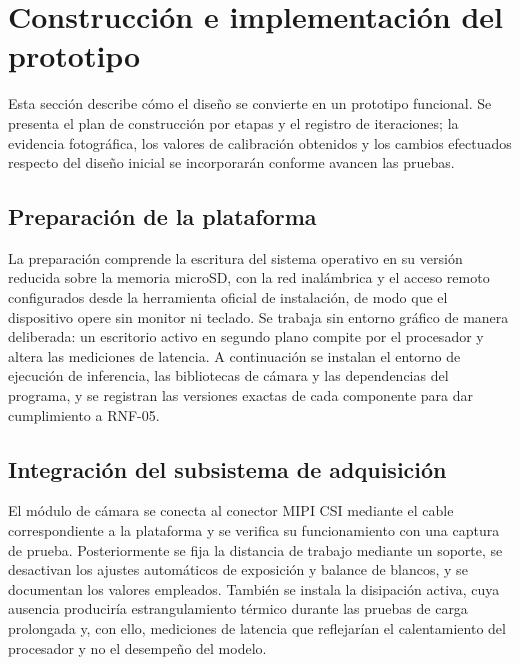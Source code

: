 \section{Construcción e implementación del prototipo}

Esta sección describe cómo el diseño se convierte en un prototipo funcional.
Se presenta el plan de construcción por etapas y el registro de iteraciones;
la evidencia fotográfica, los valores de calibración obtenidos y los cambios
efectuados respecto del diseño inicial se incorporarán conforme avancen las
pruebas.


\subsection{Preparación de la plataforma}

La preparación comprende la escritura del sistema operativo en su versión
reducida sobre la memoria microSD, con la red inalámbrica y el acceso remoto
configurados desde la herramienta oficial de instalación, de modo que el
dispositivo opere sin monitor ni teclado. Se trabaja sin entorno gráfico de
manera deliberada: un escritorio activo en segundo plano compite por el
procesador y altera las mediciones de latencia. A continuación se instalan el
entorno de ejecución de inferencia, las bibliotecas de cámara y las
dependencias del programa, y se registran las versiones exactas de cada
componente para dar cumplimiento a RNF-05.

\subsection{Integración del subsistema de adquisición}

El módulo de cámara se conecta al conector MIPI CSI mediante el cable
correspondiente a la plataforma y se verifica su funcionamiento con una
captura de prueba. Posteriormente se fija la distancia de trabajo mediante un
soporte, se desactivan los ajustes automáticos de exposición y balance de
blancos, y se documentan los valores empleados. También se instala la
disipación activa, cuya ausencia produciría estrangulamiento térmico durante
las pruebas de carga prolongada y, con ello, mediciones de latencia que
reflejarían el calentamiento del procesador y no el desempeño del modelo.

